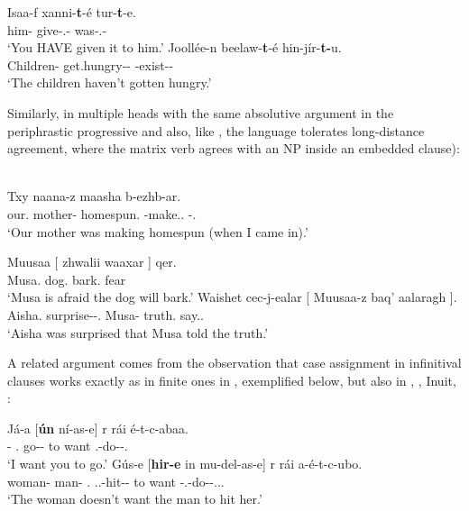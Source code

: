 \documentclass[output=paper]{langsci/langscibook}
\begin{document}
\ea%
    \label{ex:key:13.15} \parencite[99]{Baker2015}
	\ea
	\gll  Isaa-f xanni-\textbf{t}-é  tur-\textbf{t}-e.\\
	    him-\Dat{}  give-\Tsg.\Sbj{}-\Pst{}  was-\Tsg.\Sbj{}-\Pst{}\\
	\glt     ‘You HAVE given it to him.’
	\ex
	\gll  Joollée-n beelaw-\textbf{t}-é  hin-jír-\textbf{t-}u.\\
        Children-\Mnom{}  get.hungry-\glossF{}-\Pst{} \Neg{}-exist-\glossF{}-\Dep{}\\
	\glt     ‘The children haven’t gotten hungry.’
    \z
\z

Similarly, in  multiple heads  with the same
absolutive argument in the periphrastic progressive
\citep[71--72]{Baker2015} and also, like  \parencite{PolPot2001}, the
language tolerates long-distance agreement, where the matrix verb agrees with an NP inside an embedded clause):

\ea%
    \label{ex:key:13.16} \citep[263]{Nichols2011}\\
    \gll  Txy naana-z maasha b-ezhb-ar.\\
            our.\Gen{}  mother-\Erg{}  homespun.\Bb{} \Bb{}-make.\Cvb.\Sim{} \Bb{}-\Prog.\Pst\\
    \glt  ‘Our mother was making homespun (when I came in).’
\z

\ea%
    \label{ex:key:13.17} \parencite[551, 550]{Nichols2011}
	\ea
	\gll  Muusaa  [ zhwalii waaxar ]  qer.\\
            Musa.\Abs{} {} dog.\Abs{}  bark.\Vn{} {} fear\\
	\glt     ‘Musa is afraid the dog will bark.’
	\ex
	\gll  Waishet cec-j-ealar  [ Muusaa-z baq’  aalaragh ].\\
            Aisha.\Abs{}  surprise-\Jj-\Lv{}.\Pst{} {}  Musa-\Erg{} truth.\Abs{}  say.\Vn{}.\Lat{} {}\\
	\glt     ‘Aisha was surprised that Musa told the truth.’
    \z
\z

A related argument comes from the observation that case assignment in
infinitival clauses works exactly as in finite ones in ,
exemplified below, but also in , , 
Inuit, :

\ea%
    \label{ex:key:13.18} \parencite[44]{Baker2015}
	\ea
	\gll   Já-a  [\textbf{ún}  ní-as-e]                r rái é-t-c-abaa.\\
	    \Fsg-\Erg{} \Ssg.\Abs{}  go-\Inf{}-\Obl{}  to want \Tsg.\Obj{}-do-\Npst-\Fsg{}.\Prs{}\\
	\glt     ‘I want you to go.’
	\ex
	\gll  Gús-e  [\textbf{hir-e}  in mu-del-as-e]                                     r rái a-é-t-c-ubo.\\
	    woman-\Erg{}  man-\Erg{}  \Tsg{}.\Abs{} \Third.\glossF{}.\Obj{}-hit-\Inf{}-\Obl{}  to want \Neg{}-\Tsg.\Obj{}-do-\Npst{}-\Third.\glossF.\Sbj{}.\Prs{}\\
	\glt     ‘The woman doesn’t want the man to hit her.’
    \z
\z
\end{document}
